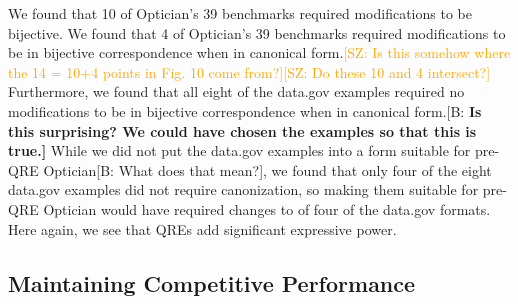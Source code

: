 \documentclass[acmsmall,review,anonymous]{acmart}
\newcommand{\FINISH}[3]{\ifdraft\textcolor{#1}{[#2: #3]}\fi}
\newcommand{\bcp}[1]{\FINISH{dkred}{B}{#1}}
\newcommand{\BCP}[1]{\FINISH{dkred}{B}{\bf #1}}
\newcommand{\saz}[1]{\FINISH{orange}{SZ}{#1}}
\begin{document}
We found that 10 of Optician's 39 benchmarks required modifications to be
bijective. We found that 4 of Optician's 39 benchmarks required modifications to
be in bijective correspondence when in canonical form.\saz{Is this somehow where
  the 14 = 10+4 points in Fig. 10 come from?}\saz{Do these 10 and 4 intersect?}
Furthermore, we found that all eight of the data.gov examples required no
modifications to be in bijective correspondence when in canonical
form.\BCP{Is this surprising?  We could have chosen the examples so that
  this is true.} While we
did not put the data.gov examples into a form suitable for pre-QRE
Optician\bcp{What does that mean?}, we
found that only four of the eight data.gov examples did not require
canonization, so making them suitable for pre-QRE Optician would have required 
changes to of four of the data.gov formats.  Here again, we see that QREs add
significant expressive power.

\subsection{Maintaining Competitive Performance}
\end{document}

